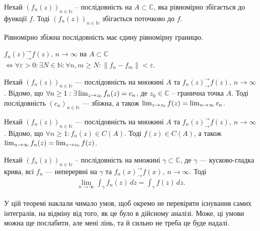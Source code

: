 \documentclass{math_library}
\begin{document}
\begin{proposition}
Нехай $(f_n(z))_{n \in \mathbb{N}}$ -- послідовність на $A \subset \mathbb{C}$, яка рівномірно збігається до функції $f$. Тоді $(f_n(z))_{n \in \mathbb{N}}$ збігається поточково до $f$.
\end{proposition}

\begin{corollary}
Рівномірно збіжна послідовність має єдину рівномірну границю.
\end{corollary}

\begin{theorem}
$f_n(z)^\rightarrow_\rightarrow f(z)$, $n \to \infty$ на $A \subset \mathbb{C}$ $\iff \forall \varepsilon > 0: \exists N \in \mathbb{N}: \forall n,m \geq N: \|f_n - f_m\| < \varepsilon$.
\end{theorem}

\begin{theorem}
\label{limit_of_funcitonal_sequence}
Нехай $(f_n(z))_{n \in \mathbb{N}}$ --- послідовність на множині $A$ та $f_n(z)^\rightarrow_\rightarrow f(z),\ n \to \infty$. Відомо, що $\forall n \geq 1: \exists\huge\lim_{z \to z_0} f_n(z) = c_n$, де $z_0 \in \mathbb{C}$ -- гранична точка $A$. Тоді послідовність $(c_n)_{n \in \mathbb{N}}$ --- збіжна, а також $\huge\lim_{z \to z_0} f(z) = \lim_{n \to \infty} c_n$.
\end{theorem}

\begin{corollary}
Нехай $(f_n(z))_{n \in \mathbb{N}}$ --- послідовність на множині $A$ та $f_n(z)^\rightarrow_\rightarrow f(z),\ n \to \infty$. Відомо, що $\forall n \geq 1: f_n(z) \in C(A)$. Тоді $f(z) \in C(A)$, а також $\huge\lim_{n \to \infty} f_n(z) = \lim_{z \to z_0} f(z)$.
\end{corollary}

\begin{theorem}
\label{integration_of_funcitonal_sequence}
Нехай $(f_n(z))_{n \in \mathbb{N}}$ -- послідовність на множині $\gamma \subset \mathbb{C}$, де $\gamma$ --- кусково-гладка крива, всі $f_n$ --- неперервні на $\gamma$ та $f_n(x)^\rightarrow_\rightarrow f(x),\ n \to \infty$. Тоді
\begin{align*}
\lim_{n \to \infty} \int_\gamma f_n(z)\,dz = \int_\gamma f(z)\,dz.
\end{align*}
\end{theorem}

У цій теоремі наклали чимало умов, щоб окремо не перевіряти існування самих інтегралів, на відміну від того, як це було в дійсному аналізі. Може, ці умови можна ще послабити, але мені лінь, та й сильно не треба це буде надалі.
\end{document}
